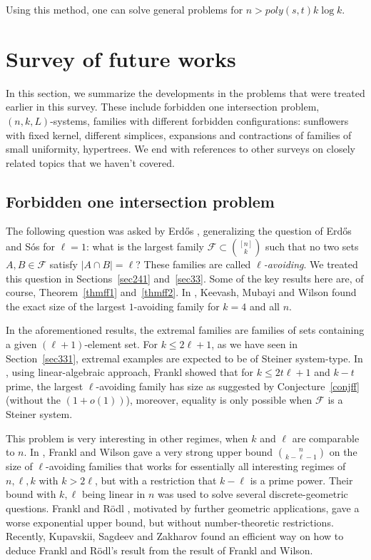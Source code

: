 \documentclass[graybox]{svmult}
\renewcommand{\le}{\leqslant}
\newcommand{\ff}{\mathcal{F}}
\begin{document}
Using this method, one can solve general problems for $n> poly(s,t) k\log k$.

\section{Survey of future works}\label{sec8}
In this section, we summarize the developments in  the problems that were treated earlier in this survey. These include forbidden one intersection problem, $(n,k,L)$-systems, families with different forbidden configurations: sunflowers with fixed kernel, different simplices, expansions and contractions of families of small uniformity, hypertrees. We end with references to other surveys on closely related topics that we haven't covered.

\subsection{Forbidden one intersection problem}\label{sec61}
The following question was asked by Erd\H os \cite{Erd75}, generalizing the question of Erd\H os and S\' os for $\ell=1$: what is the largest family $\ff\subset {[n]\choose k}$ such that no two sets  $A,B\in\ff$ satisfy $|A\cap B| = \ell$? These families are called {\it $\ell$-avoiding}. We treated this question in Sections~\ref{sec241} and~\ref{sec33}. Some of the key results here are, of course, Theorem~\ref{thmff1} and~\ref{thmff2}. In \cite{KMW}, Keevash, Mubayi and Wilson  found the exact size of the largest $1$-avoiding family for $k=4$ and all $n$.

In the aforementioned results, the extremal families are families of sets containing a given $(\ell+1)$-element set. For $k\le 2\ell+1$, as we have seen in Section~\ref{sec331}, extremal examples are expected to be of Steiner system-type. In \cite{Fra83b}, using linear-algebraic approach, Frankl showed that for $k\le 2t\ell+1$ and $k-t$ prime, the largest $\ell$-avoiding family has size as suggested by Conjecture~\ref{conjff} (without the $(1+o(1))$), moreover, equality is only possible when $\ff$ is a Steiner system.


This problem is very interesting in other regimes, when  $k$ and $\ell$ are comparable to $n$. In  \cite{FW}, Frankl and Wilson gave a very strong upper bound ${n\choose k-\ell-1}$ on the size of $\ell$-avoiding families that works for essentially all interesting regimes of $n,\ell,k$ with $k> 2\ell$, but with a restriction that $k-\ell$ is a prime power. Their bound with $k,\ell$ being linear in $n$ was used to solve several discrete-geometric questions. Frankl and R\"odl \cite{FR}, motivated by further geometric applications, gave a worse exponential upper bound, but without number-theoretic restrictions. Recently, Kupavskii, Sagdeev and Zakharov \cite{KSZ} found an efficient way on how to deduce Frankl and R\"odl's result from the result of Frankl and Wilson.
\end{document}
